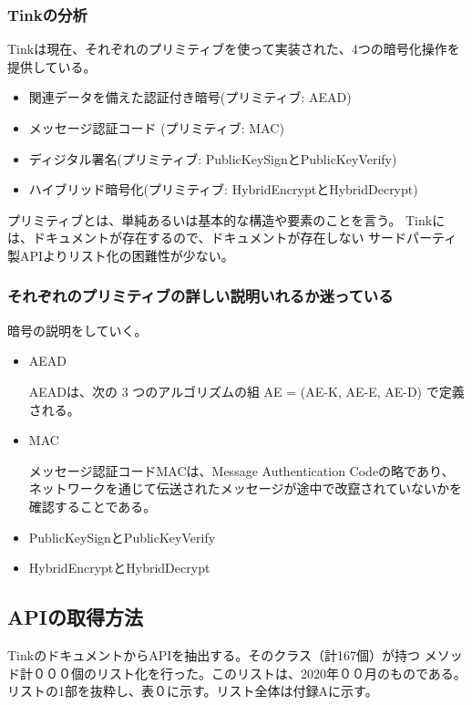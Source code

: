 \subsubsection{Tinkの分析}

Tinkは現在、それぞれのプリミティブを使って実装された、4つの暗号化操作を提供している。
\begin{itemize}
\item 関連データを備えた認証付き暗号(プリミティブ: AEAD)
\item メッセージ認証コード (プリミティブ: MAC)
\item ディジタル署名(プリミティブ: PublicKeySignとPublicKeyVerify)
\item ハイブリッド暗号化(プリミティブ: HybridEncryptとHybridDecrypt)
\end{itemize}
プリミティブとは、単純あるいは基本的な構造や要素のことを言う。
Tinkには、ドキュメントが存在するので、ドキュメントが存在しない
サードパーティ製APIよりリスト化の困難性が少ない。


\subsubsection{それぞれのプリミティブの詳しい説明いれるか迷っている}
暗号の説明をしていく。
\begin{itemize}
\item AEAD

AEADは、次の 3 つのアルゴリズムの組 AE = (AE-K, AE-E, AE-D) で定義される。

\item MAC

メッセージ認証コードMACは、Message Authentication Codeの略であり、ネットワークを通じて伝送されたメッセージが途中で改竄されていないかを確認することである。

\item PublicKeySignとPublicKeyVerify

\item HybridEncryptとHybridDecrypt

\end{itemize}
\subsection{APIの取得方法}
Tinkのドキュメント\cite{Tink Cryptography}からAPIを抽出する。そのクラス（計167個）が持つ
メソッド計０００個のリスト化を行った。このリストは、2020年００月のものである。
リストの1部を抜粋し、表０に示す。リスト全体は付録Aに示す。


